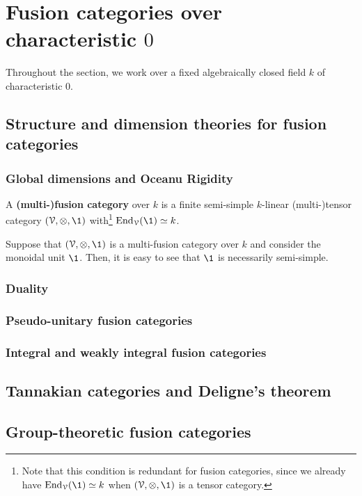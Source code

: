 \section{Fusion categories over characteristic \texorpdfstring{$0$}{}}
    \begin{convention}
        Throughout the section, we work over a fixed algebraically closed field $k$ of characteristic $0$.
    \end{convention}

    \subsection{Structure and dimension theories for fusion categories}
        \subsubsection{Global dimensions and Oceanu Rigidity}
            \begin{definition} \label{def: fusion_categories}
                A \textbf{(multi-)fusion category} over $k$ is a finite semi-simple $k$-linear (multi-)tensor category $(\calV, \tensor, \1)$ with\footnote{Note that this condition is redundant for fusion categories, since we already have $\End_{\calV}(\1) \cong k$ when $(\calV, \tensor, \1)$ is a tensor category.} $\End_{\calV}(\1) \cong k$.
            \end{definition}
            \begin{remark} \label{remark: semi_simplicity_of_monoidal_units_of_multi_fusion_categories}
                Suppose that $(\calV, \tensor, \1)$ is a multi-fusion category over $k$ and consider the monoidal unit $\1$. Then, it is easy to see that $\1$ is necessarily semi-simple. 
            \end{remark}
            
        \subsubsection{Duality}
        
        \subsubsection{Pseudo-unitary fusion categories}
        
        \subsubsection{Integral and weakly integral fusion categories}

    \subsection{Tannakian categories and Deligne's theorem}
    
    \subsection{Group-theoretic fusion categories}